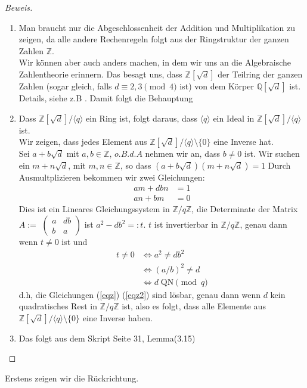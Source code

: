 \documentclass{article}
\newcommand{\Rational}{\ensuremath{\mathbb{Q}}}
\newcommand{\Integer}{\ensuremath{\mathbb{Z}}}
\newcommand{\Qadjd}{\ensuremath{\Rational[\sqrt{d}]}}
\newcommand{\Zadjd}{\ensuremath{\Integer[\sqrt{d}]}}
\newcommand{\ZAdjdModq}{\ensuremath{\Integer[\sqrt{d}]/\langle q \rangle}}
\newcommand{\Zmodq}{\ensuremath{\Integer/q\Integer}}
\newcommand{\ZadjdModqOhnez}{\ensuremath{\ZAdjdModq \setminus\! \{ 0 \}}}
\newcommand{\QNmodq}{\ensuremath{\mbox{QN} \! \pmod{q}}}
\begin{document}
\begin{proof}[Beweis]
	\begin{enumerate}
		\item Man braucht nur die Abgeschlossenheit der Addition und Multiplikation zu zeigen, da alle andere Rechenregeln folgt aus der Ringstruktur der ganzen Zahlen $\Integer$. \\ Wir k\"{o}nnen aber auch anders machen, in dem wir uns an die Algebraische Zahlentheorie erinnern. Das besagt uns, dass $\Zadjd$ der Teilring der ganzen Zahlen (sogar gleich, falls $d \equiv {2,3} \pmod{4}$ ist) von dem K\"{o}rper $\Qadjd$ ist. Details, siehe z.B \cite{zahlentheorie}. Damit folgt
		die Behauptung
		\item 
		Dass $\ZAdjdModq$ ein Ring ist, folgt daraus, dass $\langle q \rangle$ ein Ideal in $\ZAdjdModq$ ist.\\
		Wir zeigen, dass jedes Element aus $\ZadjdModqOhnez$ eine Inverse hat.\\
		Sei $a + b\sqrt{d}$ mit $a,b\in \Integer$, $o.B.d.A$ nehmen wir an, dass $b \neq 0$ ist. Wir suchen ein $m + n\sqrt{d}$, mit $m,n \in \Integer$, so dass $(a + b\sqrt{d})(m + n\sqrt{d}) = 1$ Durch Ausmultplizieren bekommen wir zwei Gleichungen:
		\begin{align}
		am + dbn &= 1 \label{eqz}\\
		an + bm &= 0  \label{eqz2}
		\end{align} 
		Dies ist ein Lineares Gleichungssystem in $\Zmodq$, die Determinate der Matrix $A := $
		$\begin{pmatrix}
		a & db\\
		b & a
		\end{pmatrix}$
		ist $a^2 - db^2 =: t$. $t$ ist invertierbar in $\Zmodq$, genau dann wenn $t\neq 0$ ist und 
		\begin{align*}
			t \neq 0 &\Leftrightarrow a^2 \neq db^2 \\
				&\Leftrightarrow (a/b)^2 \neq d\\
				&\Leftrightarrow d \; \QNmodq
		\end{align*}
		d.h, die Gleichungen (\ref{eqz}) (\ref{eqz2}) sind l\"{o}sbar, genau dann wenn
		$d$ kein quadratisches Rest in $\Zmodq$ ist, also es folgt, dass
		alle Elemente aus $\ZadjdModqOhnez$ eine Inverse haben.
		\item
		Das folgt aus dem Skript \cite{script} Seite 31, Lemma(3.15)
	\end{enumerate}
\end{proof}
Erstens zeigen wir die R\"{u}ckrichtung.
\end{document}

